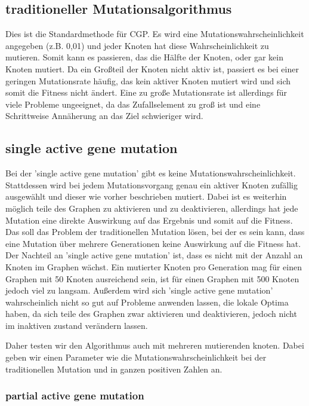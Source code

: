 \subsection{traditioneller Mutationsalgorithmus}

Dies ist die Standardmethode für CGP. Es wird eine Mutationswahrscheinlichkeit angegeben (z.B. 0,01) und jeder Knoten hat diese Wahrscheinlichkeit zu mutieren. Somit kann es passieren, das die Hälfte der Knoten, oder gar kein Knoten mutiert. Da ein Großteil der Knoten nicht aktiv ist, passiert es bei einer geringen Mutationsrate häufig, das kein aktiver Knoten mutiert wird und sich somit die Fitness nicht ändert. Eine zu große Mutationsrate ist allerdings für viele Probleme ungeeignet, da das Zufallselement zu groß ist und eine Schrittweise Annäherung an das Ziel schwieriger wird.

\subsection{single active gene mutation}

Bei der 'single active gene mutation' gibt es keine Mutationswahrscheinlichkeit. Stattdessen wird bei jedem Mutationsvorgang genau ein aktiver Knoten zufällig ausgewählt und dieser wie vorher beschrieben mutiert. Dabei ist es weiterhin möglich teile des Graphen zu aktivieren und zu deaktivieren, allerdings hat jede Mutation eine direkte Auswirkung auf das Ergebnis und somit auf die Fitness. Das soll das Problem der traditionellen Mutation lösen, bei der es sein kann, dass eine Mutation über mehrere Generationen keine Auswirkung auf die Fitness hat. Der Nachteil an 'single active gene mutation' ist, dass es nicht mit der Anzahl an Knoten im Graphen wächst. Ein mutierter Knoten pro Generation mag für einen Graphen mit 50 Knoten ausreichend sein, ist für einen Graphen mit 500 Knoten jedoch viel zu langsam. Außerdem wird sich 'single active gene mutation' wahrscheinlich nicht so gut auf Probleme anwenden lassen, die lokale Optima haben, da sich teile des Graphen zwar aktivieren und deaktivieren, jedoch nicht im inaktiven zustand verändern lassen.

Daher testen wir den Algorithmus auch mit mehreren mutierenden knoten. Dabei geben wir einen Parameter wie die Mutationswahrscheinlichkeit bei der traditionellen Mutation und in ganzen positiven Zahlen an.

\subsubsection{partial active gene mutation}

